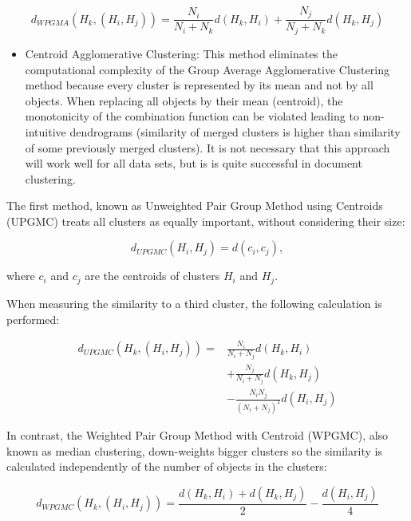 \begin{equation*}
d_{W P G M A}\left(H_{k},\left(H_{i}, H_{j}\right)\right)=\frac{N_{i}}{N_{i}+N_{k}} d\left(H_{k}, H_{i}\right)+\frac{N_{j}}{N_{j}+N_{k}} d\left(H_{k}, H_{j}\right) \tag{12.31}
\end{equation*}


\begin{itemize}
  \item Centroid Agglomerative Clustering: This method eliminates the computational complexity of the Group Average Agglomerative Clustering method because every cluster is represented by its mean and not by all objects. When replacing all objects by their mean (centroid), the monotonicity of the combination function can be violated leading to non-intuitive dendrograms (similarity of merged clusters is higher than similarity of some previously merged clusters). It is not necessary that this approach will work well for all data sets, but is is quite successful in document clustering.
\end{itemize}

The first method, known as Unweighted Pair Group Method using Centroids (UPGMC) treats all clusters as equally important, without considering their size:


\begin{equation*}
d_{U P G M C}\left(H_{i}, H_{j}\right)=d\left(c_{i}, c_{j}\right), \tag{12.32}
\end{equation*}


where $c_{i}$ and $c_{j}$ are the centroids of clusters $H_{i}$ and $H_{j}$.

When measuring the similarity to a third cluster, the following calculation is performed:


\begin{align*}
d_{U P G M C}\left(H_{k},\left(H_{i}, H_{j}\right)\right)= & \frac{N_{i}}{N_{i}+N_{j}} d\left(H_{k}, H_{i}\right) \\
& +\frac{N_{j}}{N_{i}+N_{j}} d\left(H_{k}, H_{j}\right)  \tag{12.33}\\
& -\frac{N_{i} N_{j}}{\left(N_{i}+N_{j}\right)^{2}} d\left(H_{i}, H_{j}\right)
\end{align*}


In contrast, the Weighted Pair Group Method with Centroid (WPGMC), also known as median clustering, down-weights bigger clusters so the similarity is calculated independently of the number of objects in the clusters:


\begin{equation*}
d_{W P G M C}\left(H_{k},\left(H_{i}, H_{j}\right)\right)=\frac{d\left(H_{k}, H_{i}\right)+d\left(H_{k}, H_{j}\right)}{2}-\frac{d\left(H_{i}, H_{j}\right)}{4} \tag{12.34}
\end{equation*}


